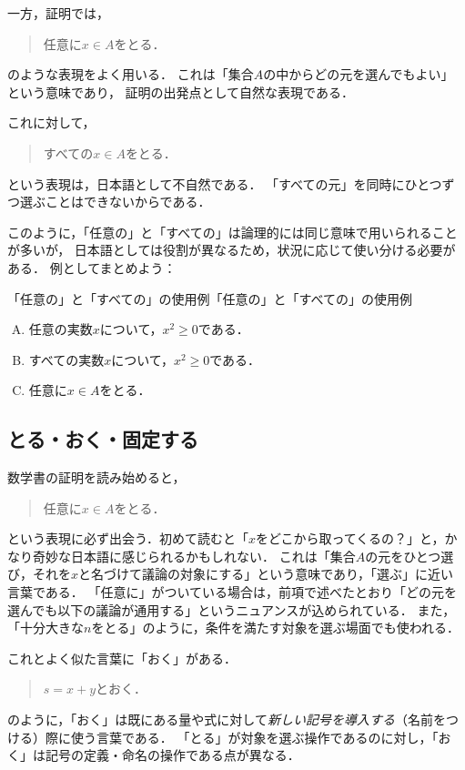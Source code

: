 一方，証明では，
\begin{quote}
任意に$x\in A$をとる．
\end{quote}
のような表現をよく用いる．
これは「集合$A$の中からどの元を選んでもよい」という意味であり，
証明の出発点として自然な表現である．

これに対して，
\begin{quote}
すべての$x\in A$をとる．
\end{quote}
という表現は，日本語として不自然である．
「すべての元」を同時にひとつずつ選ぶことはできないからである．

このように，「任意の」と「すべての」は論理的には同じ意味で用いられることが多いが，
日本語としては役割が異なるため，状況に応じて使い分ける必要がある．
例としてまとめよう：

\begin{example}{「任意の」と「すべての」の使用例}{「任意の」と「すべての」の使用例}
  \begin{enumerate}[(A)]
    \item 任意の実数$x$について，$x^2\ge0$である．
    \item すべての実数$x$について，$x^2\ge0$である．
    \item 任意に$x\in A$をとる．
  \end{enumerate}
\end{example}

\subsection{とる・おく・固定する}

数学書の証明を読み始めると，
\begin{quote}
  任意に$x \in A$をとる．
\end{quote}
という表現に必ず出会う．初めて読むと「$x$をどこから取ってくるの？」と，かなり奇妙な日本語に感じられるかもしれない．
これは「集合$A$の元をひとつ選び，それを$x$と名づけて議論の対象にする」という意味であり，「選ぶ」に近い言葉である．
「任意に」がついている場合は，前項で述べたとおり「どの元を選んでも以下の議論が通用する」というニュアンスが込められている．
また，「十分大きな$n$をとる」のように，条件を満たす対象を選ぶ場面でも使われる．

これとよく似た言葉に「おく」がある．
\begin{quote}
  $s=x+y$とおく．
\end{quote}
のように，「おく」は既にある量や式に対して\emph{新しい記号を導入する}（名前をつける）際に使う言葉である．
「とる」が対象を選ぶ操作であるのに対し，「おく」は記号の定義・命名の操作である点が異なる．

